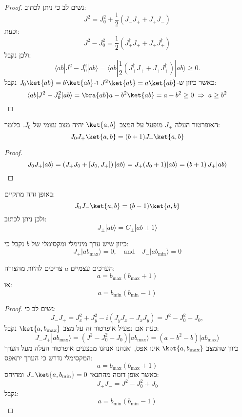 \documentclass{tstextbook}
\begin{document}
\begin{proof}
נשים לב כי ניתן לכתוב:
$$J^{2}=J_{0}^{2}+\frac{1}{2}\left(J_{-}J_{+}+J_{+}J_{-}\right)$$
וכעת:
$$J^{2}-J_{0}^{2}=\frac{1}{2}\left(J_{+}^{\dagger}J_{+}+J_{+}J_{+}^{\dagger}\right)$$
ולכן נקבל:
$$\langle a b|J^{2}-J_{0}^{2}|a b\rangle=\langle a b|\frac{1}{2}\left(J_{+}^{\dagger}J_{+}+J_{+}J_{+}^{\dagger}\right)|a b\rangle\geq0.$$
כאשר כיוון ש-\(J^{2}\ket{ab}=a\ket{ab}\) ו-\(J_{0}\ket{ab}=b\ket{ab}\) נקבל:
$$\langle a b|J^{2}-J_{0}^{2}|a b\rangle=\bra{ab}  a-b^{2}\ket{ab} =a-b^{2}\geq0\;\Rightarrow\;a\ge b^{2}$$

\end{proof}
\begin{proposition}
האופרטור העלה \(J_{+}\) מופעל על המצב \(\ket{a,b}\) יהיה מצב עצמי של \(J_{0}\). כלומר:
$$J_{0}J_{+}\ket{a,b} =(b+1)J_{+}\ket{a,b} $$

\end{proposition}
\begin{proof}
$$J_{0}J_{+}|a b\rangle=\left(J_{+}J_{0}+[J_{0},J_{+}]\right)|a b\rangle\\ =J_{+}(J_{0}+1)|a b\rangle=\left(b+1\right)J_{+}|a b\rangle$$

\end{proof}
\begin{corollary}
באופן זהה מתקיים:
$$J_{0}J_{-}\ket{a,b} =(b-1)\ket{a,b} $$
ולכן ניתן לכתוב:
$$J_{\pm}|a b\rangle=C_{\pm}|a b\pm1\rangle$$

\end{corollary}
\begin{corollary}
כיוון שיש ערך מינימלי ומקסימלי של \(b\) נקבל כי:
$$J_{+}|a b_{\mathrm{max}}\rangle=0,\quad\mathrm{and}\quad J_{-}|a b_{\mathrm{min}}\rangle=0$$

\end{corollary}
\begin{corollary}
הערכים עצמיים \(a\) צריכים להיות מהצורה:
$$a=b_{\operatorname*{max}}(b_{\operatorname*{max}}+1)$$
או:
$$a=b_{\operatorname*{min}}(b_{\operatorname*{min}}-1)$$

\end{corollary}
\begin{proof}
נשים לב כי:
$$J_{-}J_{+}=J_{x}^{2}+J_{y}^{2}-i\left(J_{y}J_{x}-J_{x}J_{y}\right)=J^{2}-J_{0}^{2}-J_{0},$$
כעת אם נפעיל אופרטור זה על מצב \(\ket{a, b_{\text{max}}}\) נקבל:
$$J_{-}J_{+}|a b_{\mathrm{max}}\rangle=(J^{2}-J_{0}^{2}-J_{0})|a b_{\mathrm{max}}\rangle=(a-b^{2}-b)|a b_{\mathrm{max}}\rangle$$
כיוון שהמצב \(\ket{a,b_{\max}}\) אינו אפס, ואנחנו אנחנו מבצעים אופרטור העלה מעל הערך המקסימלי נדרש כי הערך יתאפס:
$$a=b_{\operatorname*{max}}(b_{\operatorname*{max}}+1)$$
כאשר אופן דומה מהתנאי \(J_{-}\ket{a,b_{\text{min}}}=0\) ומהיחס:
$$J_{+}J_{-}=J^{2}-J_{0}^{2}+J_{0}$$
נקבל:
$$a=b_{\operatorname*{min}}(b_{\operatorname*{min}}-1)$$

\end{proof}
\end{document}

